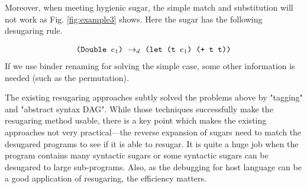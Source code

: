 Moreover, when meeting hygienic sugar, the simple match and substitution will not work as Fig. \ref{fig:example3} shows. Here the  sugar has the following desugaring rule.

\[
\begin{array}{l}
\texttt{(Double $e_1$)} ~\rightarrow_d~ \texttt{(let (t $e_1$) (+ t t))}\\
\end{array}
\]
If we use binder renaming for solving the simple case, some other information is needed (such as the permutation).



The existing resugaring approaches subtly solved the problems above by "tagging"\cite{resugaring} and "abstract syntax DAG"\cite{hygienic}. While those techniques successfully make the resugaring method usable, there is a key point which makes the existing approaches not very practical---the reverse expansion of sugars need to match the desugared programs to see if it is able to resugar. It is quite a huge job when the program contains many syntactic sugars or some syntactic sugars can be desugared to large sub-programs.
Also, as the debugging for host language can be a good application of resugaring, the efficiency matters.



